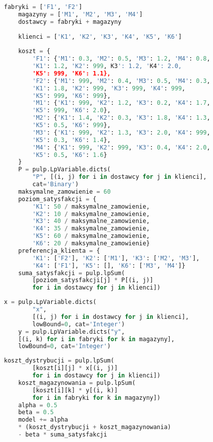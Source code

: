 \documentclass[12pt]{article}
\begin{document}
\begin{lstlisting}[language=Python, caption={Zdefiniowanie zmiennych i parametrów}]
    fabryki = ['F1', 'F2']
    magazyny = ['M1', 'M2', 'M3', 'M4']
    dostawcy = fabryki + magazyny 
    
    klienci = ['K1', 'K2', 'K3', 'K4', 'K5', 'K6']
    
    koszt = {
        'F1': {'M1': 0.3, 'M2': 0.5, 'M3': 1.2, 'M4': 0.8,
        'K1': 1.2, 'K2': 999, K3': 1.2, 'K4': 2.0,
        'K5': 999, 'K6': 1.1},
        'F2': {'M1': 999, 'M2': 0.4, 'M3': 0.5, 'M4': 0.3,
        'K1': 1.8, 'K2': 999, 'K3': 999, 'K4': 999,
        'K5': 999, 'K6': 999},
        'M1': {'K1': 999, 'K2': 1.2, 'K3': 0.2, 'K4': 1.7,
        'K5': 999, 'K6': 2.0},
        'M2': {'K1': 1.4, 'K2': 0.3, 'K3': 1.8, 'K4': 1.3,
        'K5': 0.5, 'K6': 999},
        'M3': {'K1': 999, 'K2': 1.3, 'K3': 2.0, 'K4': 999,
        'K5': 0.3, 'K6': 1.4},
        'M4': {'K1': 999, 'K2': 999, 'K3': 0.4, 'K4': 2.0,
        'K5': 0.5, 'K6': 1.6}
    }
    P = pulp.LpVariable.dicts(
        "P", [(i, j) for i in dostawcy for j in klienci],
        cat='Binary')
    maksymalne_zamowienie = 60
    poziom_satysfakcji = {
        'K1': 50 / maksymalne_zamowienie,
        'K2': 10 / maksymalne_zamowienie,
        'K3': 40 / maksymalne_zamowienie,
        'K4': 35 / maksymalne_zamowienie,
        'K5': 60 / maksymalne_zamowienie,
        'K6': 20 / maksymalne_zamowienie}
    preferencja_klienta = {
        'K1': ['F2'], 'K2': ['M1'], 'K3': ['M2', 'M3'],
        'K4': ['F1'], 'K5': [], 'K6': ['M3', 'M4']}
    suma_satysfakcji = pulp.lpSum(
        [poziom_satysfakcji[j] * P[(i, j)]
        for i in dostawcy for j in klienci])
\end{lstlisting}

\begin{lstlisting}[language=Python, caption={Zmienne decyzyjne}]
    x = pulp.LpVariable.dicts(
        "x",
        [(i, j) for i in dostawcy for j in klienci],
        lowBound=0, cat='Integer')
    y = pulp.LpVariable.dicts("y",
    [(i, k) for i in fabryki for k in magazyny],
    lowBound=0, cat='Integer')
\end{lstlisting}

\begin{lstlisting}[language=Python, caption={Funkcje celu}]
    koszt_dystrybucji = pulp.lpSum(
        [koszt[i][j] * x[(i, j)]
        for i in dostawcy for j in klienci])
    koszt_magazynowania = pulp.lpSum(
        [koszt[i][k] * y[(i, k)]
        for i in fabryki for k in magazyny])
    alpha = 0.5
    beta = 0.5
    model += alpha
    * (koszt_dystrybucji + koszt_magazynowania)
    - beta * suma_satysfakcji
\end{lstlisting}
\end{document}
